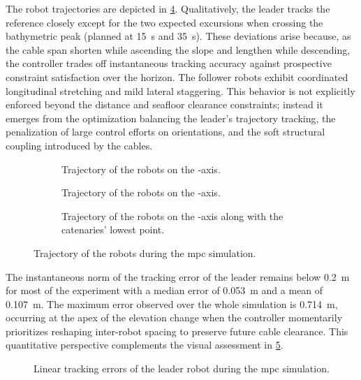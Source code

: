 The robot trajectories are depicted in \cref{rcc_s_mpc_r_poses}. Qualitatively, the leader tracks
the reference closely except for the two expected excursions when crossing the bathymetric peak
(planned at \qty{15}{\s} and \qty{35}{\s}). These deviations arise because, as the cable span
shorten while ascending the slope and lengthen while descending, the controller trades off
instantaneous tracking accuracy against prospective constraint satisfaction over the horizon. The
follower robots exhibit coordinated longitudinal stretching and mild lateral staggering. This
behavior is not explicitly enforced beyond the distance and seafloor clearance constraints; instead
it emerges from the optimization balancing the leader's trajectory tracking, the penalization of
large control efforts on orientations, and the soft structural coupling introduced by the cables.

\begin{figure}
	\centering
	\begin{subfigure}{\figurewidth}
		\centering
		\caption{Trajectory of the robots on the -axis.}
		\label{rcc_s_mpc_r_pose_x}
	\end{subfigure}
	\begin{subfigure}{\figurewidth}
		\centering
		\caption{Trajectory of the robots on the -axis.}
		\label{rcc_s_mpc_r_pose_y}
	\end{subfigure}
	\begin{subfigure}{\figurewidth}
		\centering
		\caption{Trajectory of the robots on the -axis along with the catenaries' lowest point.}
		\label{rcc_s_mpc_r_pose_z}
	\end{subfigure}
	\caption{Trajectory of the robots during the \ac{mpc} simulation.}
	\label{rcc_s_mpc_r_poses}
\end{figure}

The instantaneous norm of the tracking error of the leader remains below \qty{0.2}{\m} for most of
the experiment with a median error of \qty{0.053}{\m} and a mean of \qty{0.107}{\m}. The maximum
error observed over the whole simulation is \qty{0.714}{\m}, occurring at the apex of the elevation
change when the controller momentarily prioritizes reshaping inter-robot spacing to preserve future
cable clearance. This quantitative perspective complements the visual assessment in
\cref{rcc_s_mpc_r_error}.
\begin{figure}
	\centering
	\caption{Linear tracking errors of the leader robot during the \ac{mpc} simulation.}
	\label{rcc_s_mpc_r_error}
\end{figure}

